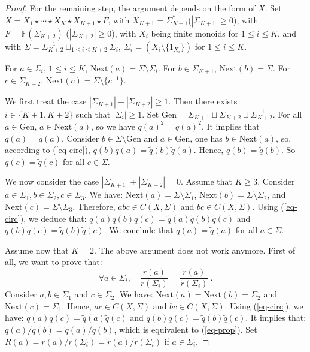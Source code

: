 \documentclass[11pt,a4paper]{article}
\theoremstyle{remark}
\def\Blackboardfont{\mathbb}
\newcommand{\moins}{ {\setminus} }
\def\rig{\text{Next}}
\def\F{{\Blackboardfont F}}
\def\eref#1{(\ref{#1})}
\begin{document}
\begin{proof}
For the remaining step, the argument depends on the form of $X$.
Set $X= X_1\star \cdots \star X_K \star X_{K+1} \star F $, with
$X_{K+1}=\Sigma_{K+1}^*$($|\Sigma_{K+1}|\geq 0$), with
$F=\F(\Sigma_{K+2})$ ($|\Sigma_{K+2}|\geq 0$), with $X_i$ being
finite monoids for $1\leq i \leq K$, and with
$\Sigma=\Sigma_{K+2}^{-1}\sqcup_{1\leq i\leq K+2} \Sigma_i, \
\Sigma_i=(X_i\moins\{1_{X_i}\})$ for $1\leq i \leq K$.

For $a\in\Sigma_i$, $1\leq i \leq K$, $\rig(a)=\Sigma \setminus
\Sigma_i$. For $b \in \Sigma_{K+1}$, $\rig(b)=\Sigma$. For
$c\in\Sigma_{K+2}$, $\rig(c)=\Sigma\setminus\{c^{-1}\}$. 

\medskip

We first treat the case $|\Sigma_{K+1}| + |\Sigma_{K+2}| \geq 1$.
Then there exists $i \in \{K+1,K+2\}$ such that $|\Sigma_{i}|\geq
1$. Set $\text{Gen}=\Sigma_{K+1} \sqcup
\Sigma_{K+2}\sqcup\Sigma_{K+2}^{-1}$. 
For all $a\in \text{Gen}$, $a \in \rig(a)$, so we have
$q(a)^2=\tilde{q}(a)^2$. It implies that $q(a)=\tilde{q}(a)$.
Consider $b\in\Sigma\setminus \text{Gen}$ and $a\in \text{Gen}$, one
has $b\in\rig(a)$, so, according to \eref{eq-circ},
$q(b)q(a)=\tilde{q}(b)\tilde{q}(a)$. Hence, $q(b)=\tilde{q}(b)$.
So $q(c)=\tilde{q}(c)$ for all $c\in \Sigma$.

\medskip

We now consider the case $|\Sigma_{K+1}| + |\Sigma_{K+2}| =0$.
Assume that $K\geq 3$. Consider $a\in \Sigma_1, b\in \Sigma_2,
c\in \Sigma_3$. We have: $\rig(a)=\Sigma\moins \Sigma_1$,
$\rig(b)=\Sigma\moins \Sigma_2$, and $\rig(c)=\Sigma\moins
\Sigma_3$. Therefore, $abc \in C(X,\Sigma)$ and $bc \in
C(X,\Sigma)$. Using \eref{eq-circ}, we deduce that:
$q(a)q(b)q(c)=\tilde{q}(a)\tilde{q}(b)\tilde{q}(c)$ and
$q(b)q(c)=\tilde{q}(b)\tilde{q}(c)$. We conclude that
$q(a)=\tilde{q}(a)$ for all $a\in \Sigma$.

\medskip

Assume now that $K=2$. The above argument does not work anymore.
First of all, we want to prove that:
\begin{equation}\label{eq-prop}
\forall a\in \Sigma_i, \quad \frac{r(a)}{r(\Sigma_i)} =
\frac{\tilde{r}(a)}{\tilde{r}(\Sigma_i)} \:.
\end{equation}
Consider $a,b \in \Sigma_1$ and $c\in \Sigma_2$. We have:
$\rig(a)=\rig(b)=\Sigma_2$ and $\rig(c)=\Sigma_1$. Hence, $ac \in
C(X,\Sigma)$ and $bc \in C(X,\Sigma)$. Using \eref{eq-circ}, we
have: $q(a)q(c)=\tilde{q}(a)\tilde{q}(c)$ and $
q(b)q(c)=\tilde{q}(b)\tilde{q}(c)$. It implies that:
$q(a)/q(b)=\tilde{q}(a)/\tilde{q}(b)$, which is equivalent to
\eref{eq-prop}. Set
$R(a)=r(a)/r(\Sigma_i)=\tilde{r}(a)/\tilde{r}(\Sigma_i)$ if $a\in
\Sigma_i$.



\end{proof}
\end{document}
